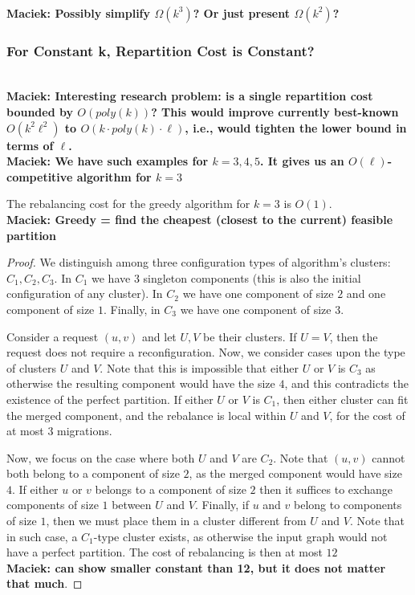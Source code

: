 \documentclass[manuscript,screen=true]{acmart}
\newcommand\maciek[1]{\color{brown}\textbf{\\ Maciek: #1}\color{black}}
\begin{document}
\begin{appendix}
    \maciek{Possibly simplify $\Omega(k^3)$? Or just present $\Omega(k^2)$?}
    
    \subsubsection{For Constant k, Repartition Cost is Constant?}
    
    \maciek{Interesting research problem: is a single repartition cost bounded by $O(poly(k))$? This would improve currently best-known $O(k^2\ell^2)$ to $O(k\cdot poly(k) \cdot \ell)$, i.e., would tighten the lower bound in terms of $\ell$.}
      \maciek{We have such examples for $k=3,4,5$. It gives us an $O(\ell)$-competitive algorithm for $k=3$}
    
    \begin{lemma} \label{lemma:k=3}
      The rebalancing cost for the greedy algorithm for $k=3$ is $O(1)$.
      \maciek{Greedy = find the cheapest (closest to the current) feasible partition}
      \label{rebalancing-cost}
    \end{lemma}
    
    \begin{proof} 
      
      We distinguish among three configuration types of algorithm's clusters: $C_1, C_2, C_3$. In $C_1$ we have $3$ singleton components (this is also the initial configuration of any cluster). In $C_2$ we have one component of size $2$ and one component of size $1$. Finally, in $C_3$ we have one component of size $3$.
    
      Consider a request $(u, v)$ and let $U, V$ be their clusters.
      If $U=V$, then the request does not require a reconfiguration.
      Now, we consider cases upon the type of clusters $U$ and $V$.
      Note that this is impossible that either $U$ or $V$ is $C_3$ as otherwise the resulting component would have the size $4$, and this contradicts the existence of the perfect partition.
      If either $U$ or $V$ is $C_1$, then either cluster can fit the merged component, and the rebalance is local within $U$ and $V$, for the cost of at most $3$ migrations.
    
      Now, we focus on the case where both $U$ and $V$ are $C_2$. Note that $(u,v)$ cannot both belong to a component of size $2$, as the merged component would have size $4$.
      If either $u$ or $v$ belongs to a component of size $2$ then it suffices to exchange components of size $1$ between $U$ and $V$.
      Finally, if $u$ and $v$ belong to components of size $1$, then we must place them in a cluster different from $U$ and $V$.
      Note that in such case, a $C_1$-type cluster exists, as otherwise the input graph would not have a perfect partition. The cost of rebalancing is then at most $12$ \maciek{can show smaller constant than 12, but it does not matter that much}.
    \end{proof}
    

\end{appendix}
\end{document}
